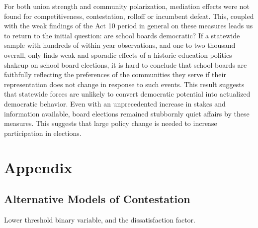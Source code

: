 For both union strength and community polarization, mediation effects were not 
found for competitiveness, contestation, rolloff or incumbent defeat. This, 
coupled with the weak findings of the Act 10 period in general on these measures 
leads us to return to the initial question: are school boards democratic? If a 
statewide sample with hundreds of within year observations, and one to two 
thousand overall, only finds weak and sporadic effects of a historic education 
politics shakeup on school board elections, it is hard to conclude that school 
boards are faithfully reflecting the preferences of the communities they serve 
if their representation does not change in response to such events. This result 
suggests that statewide forces are unlikely to convert democratic potential into 
actualized democratic behavior. Even with an unprecedented increase in stakes and 
information available, board elections remained stubbornly quiet affairs by these 
measures. This suggests that large policy change is needed to increase participation 
in elections. 

\clearpage

\section{Appendix}

\subsection{Alternative Models of Contestation}

Lower threshold binary variable, and the dissatisfaction factor.

